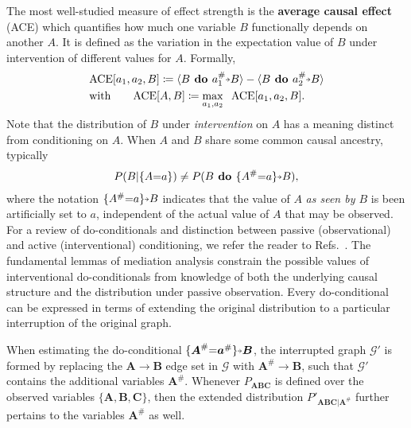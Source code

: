 \documentclass[superscriptaddress,aps,prx,nofootinbib,twocolumn,twoside,reprint,letterpaper,longbibliography]{revtex4-2}
\newcommand{\term}[1]{\textcolor{medblue}{\textbf{#1}}}
\DeclarePairedDelimiter{\expec}{\langle}{\rangle}
\DeclarePairedDelimiter{\braces}{\lbrace}{\rbrace}
\newcommand{\shortto}[1][3pt]{\mathrel{%
   \hbox{\rule[\dimexpr\fontdimen22\textfont2-.2pt\relax]{#1}{.4pt}}%
   \mkern-4mu\hbox{\usefont{U}{lasy}{m}{n}\symbol{41}}}}
\begin{document}
The most well-studied measure of effect strength is the \term{average causal effect} (ACE) which quantifies how much one variable $B$ functionally depends on another $A$. It is defined as the variation in the expectation value of $B$ under intervention of different values for $A$. Formally,
\begin{align}\begin{split}
&{\operatorname{ACE}}[a_1,a_2,B]\coloneqq \expec{B\textbf{ do } a^\#_1{\shortto} B}-\expec{B\textbf{ do } a^\#_2{\shortto} B}
\\&\text{with}\qquad{\operatorname{ACE}}[A,B]\coloneqq\displaystyle\max\limits_{a_1, a_2} \;\;{\operatorname{ACE}[a_1,a_2,B]}.
\end{split}\end{align}
Note that the distribution of $B$ under \emph{intervention} on $A$ has a meaning distinct from conditioning on $A$. When $A$ and $B$ share some common causal ancestry, typically
\begin{align}
P(B\vert\braces{A{=}a})\neq P(B\textbf{ do } \braces{A^\#{=}a}{\shortto} B),
\end{align}
where the notation $\braces{A^\#{=}a}{\shortto} B$ indicates that the value of $A$ \emph{as seen by $B$} is been artificially set to $a$, independent of the actual value of $A$ that may be observed. For a review of do-conditionals and distinction between passive (observational) and active (interventional) conditioning, we refer the reader to Refs.~\cite{shpitser2016,shpitser2018identification,stensrud2019separable,malinsky2019potential}.
The fundamental lemmas of mediation analysis constrain the possible values of interventional do-conditionals from knowledge of both the underlying causal structure and the distribution under passive observation. Every do-conditional can be expressed in terms of extending the original distribution to a particular interruption of the original graph.

When estimating the do-conditional ${\braces{\boldsymbol{A}^\#{=}\boldsymbol{a}^\#}{\shortto}\boldsymbol{B}}$, the interrupted graph $\mathcal{G'}$ is formed by replacing the  ${\boldsymbol{A}{\to} \boldsymbol{B}}$ edge set in $\mathcal{G}$ with ${\boldsymbol{A}^\#{\to} \boldsymbol{B}}$, such that $\mathcal{G'}$ contains the additional variables $\boldsymbol{A}^\#$. Whenever $P_{\boldsymbol{ABC}}$ is defined over the observed variables ${\{\boldsymbol{A},\boldsymbol{B},\boldsymbol{C}\}}$, then the extended distribution $P'_{\boldsymbol{ABC}\vert\boldsymbol{A}^\#}$ further pertains to the variables $\boldsymbol{A}^\#$ as well.
\end{document}
